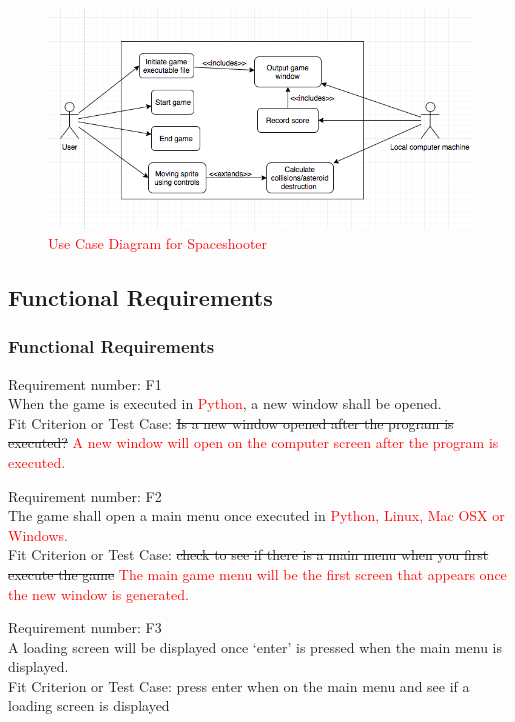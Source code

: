 \documentclass[12pt, titlepage]{article}
\begin{document}
\begin{figure}[H]
\centering
\includegraphics[scale=0.5]{USECASE}
\caption{\textcolor{red}{Use Case Diagram for Spaceshooter }}
\end{figure}

\subsection{Functional Requirements}

\subsubsection{Functional Requirements}
Requirement number: F1
\\When the game is executed in \textcolor{red}{Python}, a new window shall be opened.
\\Fit Criterion or Test Case: \sout{Is a new window opened after the program is executed?}
\textcolor{red}{A new window will open on the computer screen after the program is executed.}
\bigskip

\noindent Requirement number: F2
\\The game shall open a main menu once executed in \textcolor{red}{Python, Linux, Mac OSX or Windows.}
\\Fit Criterion or Test Case: \sout{check to see if there is a main menu when you first execute the game}
\textcolor{red}{The main game menu will be the first screen that appears once the new window is generated.}
\bigskip

\noindent Requirement number: F3
\\A loading screen will be displayed once `enter' is pressed when the main menu is displayed.
\\Fit Criterion or Test Case: press enter when on the main menu and see if a loading screen is displayed
\bigskip
\end{document}

